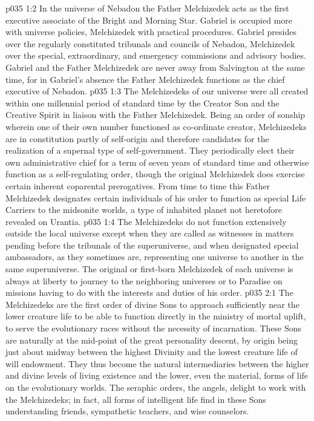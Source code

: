\vs p035 1:2 In the universe of Nebadon the Father Melchizedek acts as the first executive associate of the Bright and Morning Star. Gabriel is occupied more with universe policies, Melchizedek with practical procedures. Gabriel presides over the regularly constituted tribunals and councils of Nebadon, Melchizedek over the special, extraordinary, and emergency commissions and advisory bodies. Gabriel and the Father Melchizedek are never away from Salvington at the same time, for in Gabriel’s absence the Father Melchizedek functions as the chief executive of Nebadon.\plusone
\vs p035 1:3 The Melchizedeks of our universe were all created within one millennial period of standard time by the Creator Son and the Creative Spirit in liaison with the Father Melchizedek. Being an order of sonship wherein one of their own number functioned as co\hyp{}ordinate creator, Melchizedeks are in constitution partly of self\hyp{}origin and therefore candidates for the realization of a supernal type of self\hyp{}government. They periodically elect their own administrative chief for a term of seven years of standard time and otherwise function as a self\hyp{}regulating order, though the original Melchizedek does exercise certain inherent coparental prerogatives. From time to time this Father Melchizedek designates certain individuals of his order to function as special Life Carriers to the midsonite worlds, a type of inhabited planet not heretofore revealed on Urantia.
\vs p035 1:4 The Melchizedeks do not function extensively outside the local universe except when they are called as witnesses in matters pending before the tribunals of the superuniverse, and when designated special ambassadors, as they sometimes are, representing one universe to another in the same superuniverse. The original or first\hyp{}born Melchizedek of each universe is always at liberty to journey to the neighboring universes or to Paradise on missions having to do with the interests and duties of his order.
\vs p035 2:1 The Melchizedeks are the first order of divine Sons to approach sufficiently near the lower creature life to be able to function directly in the ministry of mortal uplift, to serve the evolutionary races without the necessity of incarnation. These Sons are naturally at the mid\hyp{}point of the great personality descent, by origin being just about midway between the highest Divinity and the lowest creature life of will endowment. They thus become the natural intermediaries between the higher and divine levels of living existence and the lower, even the material, forms of life on the evolutionary worlds. The seraphic orders, the angels, delight to work with the Melchizedeks; in fact, all forms of intelligent life find in these Sons understanding friends, sympathetic teachers, and wise counselors.
